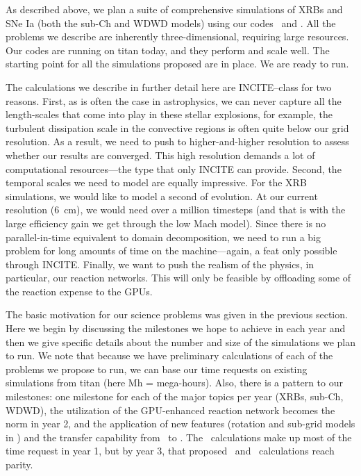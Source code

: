 As described above, we plan a suite of comprehensive simulations of
XRBs and SNe Ia (both the sub-Ch and WDWD models) using our
codes \maestro\ and \castro.  All the problems we
describe are inherently three-dimensional, requiring large resources.
Our codes are running on titan today, and they perform and scale
well.  The starting point for all the simulations proposed are in
place.  We are ready to run.

The calculations we describe in further detail here are INCITE--class
for two reasons.  First, as is often the case in astrophysics, we can
never capture all the length-scales that come into play in these
stellar explosions, for example, the turbulent dissipation scale in
the convective regions is often quite below our grid resolution.  As a
result, we need to push to higher-and-higher resolution to assess
whether our results are converged.  This high resolution demands a lot
of computational resources---the type that only INCITE can provide.
Second, the temporal scales we need to model are equally impressive.
For the XRB simulations, we would like to model a second of evolution.
At our current resolution (6~cm), we would need over a million
timesteps (and that is with the large efficiency gain we get through
the low Mach model).  Since there is no parallel-in-time equivalent to
domain decomposition, we need to run a big problem for long amounts of
time on the machine---again, a feat only possible through INCITE.
Finally, we want to push the realism of the physics, in particular,
our reaction networks.  This will only be feasible by offloading some
of the reaction expense to the GPUs.

The basic motivation for our science problems was given in the
previous section.  Here we begin by discussing the milestones we hope
to achieve in each year and then we give specific details about the
number and size of the simulations we plan to run.  We note that because
we have preliminary calculations of each of the problems we propose to
run, we can base our time requests on existing simulations from titan
(here Mh = mega-hours).  Also, there is a pattern to our milestones:
one milestone for each of the major topics per year (XRBs, sub-Ch,
WDWD), the utilization of the GPU-enhanced reaction network becomes the norm in year 2,
and the application of new features (rotation and sub-grid models in
\maestro) and the transfer capability from \maestro\ to \castro.
The \maestro\ calculations make up most of the time request in year 1, but
by year 3, that proposed \castro\ and \maestro\ calculations reach parity.

